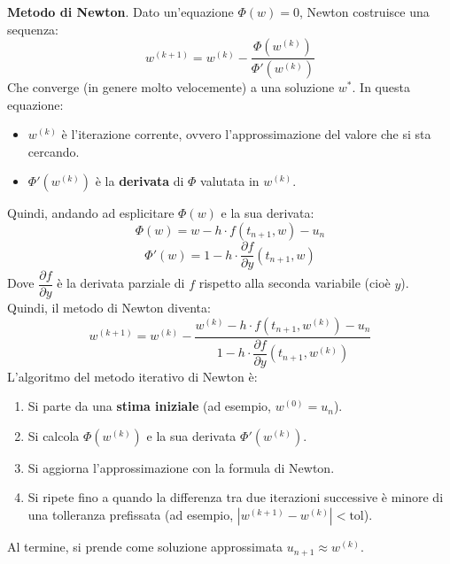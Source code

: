 \begin{itemize}
    \highspace
    \textbf{Metodo di Newton}. Dato un'equazione $\Phi(w) = 0$, Newton costruisce una sequenza:
    \begin{equation*}
        w^{\left(k+1\right)} = w^{\left(k\right)} - \dfrac{\Phi\left(w^{\left(k\right)}\right)}{\Phi'\left(w^{\left(k\right)}\right)}
    \end{equation*}
    Che converge (in genere molto velocemente) a una soluzione $w^{*}$. In questa equazione:
    \begin{itemize}
        \item $w^{(k)}$ è l'iterazione corrente, ovvero l'approssimazione del valore che si sta cercando.
        \item $\Phi'(w^{(k)})$ è la \textbf{derivata} di $\Phi$ valutata in $w^{(k)}$.
    \end{itemize}
    Quindi, andando ad esplicitare $\Phi(w)$ e la sua derivata:
    \begin{equation*}
        \Phi(w) = w - h \cdot f(t_{n+1}, w) - u_n
    \end{equation*}
    \begin{equation*}
        \Phi'(w) = 1 - h \cdot \dfrac{\partial f}{\partial y}(t_{n+1}, w)
    \end{equation*}
    Dove $\dfrac{\partial f}{\partial y}$ è la derivata parziale di $f$ rispetto alla seconda variabile (cioè $y$). Quindi, il metodo di Newton diventa:
    \begin{equation*}
        w^{\left(k+1\right)} = w^{\left(k\right)} - \dfrac{w^{\left(k\right)} - h \cdot f\left(t_{n+1}, w^{\left(k\right)}\right) - u_n}{1 - h \cdot \dfrac{\partial f}{\partial y}(t_{n+1}, w^{\left(k\right)})}
    \end{equation*}
    L'algoritmo del metodo iterativo di Newton è:
    \begin{enumerate}
        \item Si parte da una \textbf{stima iniziale} (ad esempio, $w^{(0)} = u_n$).
        \item Si calcola $\Phi(w^{(k)})$ e la sua derivata $\Phi'(w^{(k)})$.
        \item Si aggiorna l'approssimazione con la formula di Newton.
        \item Si ripete fino a quando la differenza tra due iterazioni successive è minore di una tolleranza prefissata (ad esempio, $|w^{(k+1)} - w^{(k)}| < \text{tol}$).
    \end{enumerate}
    Al termine, si prende come soluzione approssimata $u_{n+1} \approx w^{(k)}$.


\end{itemize}
